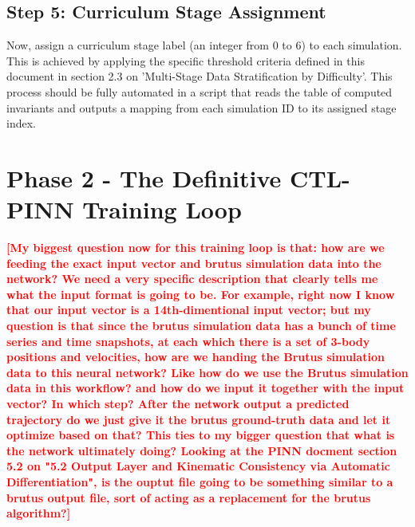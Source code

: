 \documentclass{article}
\newcommand{\authcomment}[1]{\textcolor{Red}{\textbf{[#1]}}}
\begin{document}
\subsection{Step 5: Curriculum Stage Assignment}
Now, assign a curriculum stage label (an integer from 0 to 6) to each simulation. 
This is achieved by applying the specific threshold criteria defined in this document in section 2.3 on 'Multi-Stage Data Stratification by Difficulty'. 
This process should be fully automated in a script that reads the table of computed invariants and outputs a mapping from each simulation ID to its assigned stage index.

















\section{Phase 2 - The Definitive CTL-PINN Training Loop}

\authcomment{My biggest question now for this training loop is that: 
how are we feeding the exact input vector and brutus simulation data into the network? We need a very specific description that clearly tells me
what the input format is going to be. For example, right now I know that our input vector is a 14th-dimentional input vector; but my question is that
since the brutus simulation data has a bunch of time series and time snapshots, at each which there is a set of 3-body positions and velocities,
how are we handing the Brutus simulation data to
this neural network? Like how do we use the Brutus simulation data in this workflow? and how do we input it together with the input vector?
In which step? After the network
output a predicted trajectory do we just give it the brutus ground-truth data and let it optimize based on that?
This ties to my bigger question that what is the network ultimately doing? Looking at the PINN docment section 5.2 on 
"5.2 Output Layer and Kinematic Consistency via Automatic Differentiation", is the ouptut file going to be something similar to a brutus output file, 
sort of acting as a replacement for the brutus algorithm?}
\end{document}
